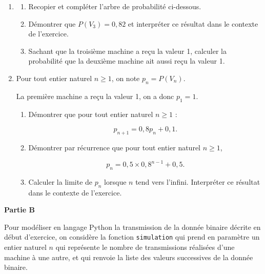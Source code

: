 \begin{enumerate}
\item 
	\begin{enumerate}
		\item Recopier et compléter l'arbre de probabilité ci-dessous.

\medskip

\begin{center}
{
	{ \taput{\ldots}
	 \tbput{\ldots}
	}
	{ \taput{\ldots}
	 \tbput{\ldots}
	}
}
\end{center}

		\item Démontrer que $P(V_3) = 0,82$ et interpréter ce résultat dans le contexte de l'exercice.
		\item Sachant que la troisième machine a reçu la valeur 1, calculer la probabilité que la deuxième machine ait aussi reçu la valeur 1.
	\end{enumerate}
\item Pour tout entier naturel $n \geqslant 1$, on note $p_n = P(V_n)$.

La première machine a reçu la valeur 1, on a donc $p_1 = 1$.
	\begin{enumerate}
		\item Démontrer que pour tout entier naturel $n \geqslant 1$ :
		
\[p_{n+1} = 0,8p_n + 0,1.\]

		\item Démontrer par récurrence que pour tout entier naturel $n \geqslant 1$,

\[p_n = 0,5 \times 0,8^{n-1} + 0,5.\]

		\item Calculer la limite de $p_n$ lorsque $n$ tend vers l'infini. Interpréter ce résultat dans le contexte de l'exercice.
	\end{enumerate}
\end{enumerate}


\textbf{Partie B}

\medskip

Pour modéliser en langage Python la transmission de la donnée binaire décrite en début d'exercice, on considère la fonction \texttt{simulation} qui prend en paramètre un entier naturel $n$ qui représente le nombre de transmissions réalisées d'une machine à une autre, et qui renvoie la liste des valeurs successives de la donnée binaire.

